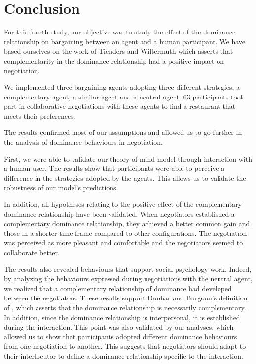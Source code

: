 \documentclass[10pt, a4paper, twocolumn]{article} %
\begin{document}
					
\section{Conclusion}

For this fourth study, our objective was to study the effect of the dominance relationship on bargaining between an agent and a human participant. We have based ourselves on the work of Tienders and Wiltermuth \cite{wiltermuth2009benefits,tiedens2003power} which asserts that complementarity in the dominance relationship had a positive impact on negotiation. 

We implemented three bargaining agents adopting three different strategies, a complementary agent, a similar agent and a neutral agent. 
63 participants took part in collaborative negotiations with these agents to find a restaurant that meets their preferences. 

The results confirmed most of our assumptions and allowed us to go further in the analysis of dominance behaviours in negotiation. 

First, we were able to validate our theory of mind model through interaction with a human user. 
The results show that participants were able to perceive a difference in the strategies adopted by the agents. This allows us to validate the robustness of our model's predictions. 

In addition, all hypotheses relating to the positive effect of the complementary dominance relationship have been validated. When negotiators established a complementary dominance relationship, they achieved a better common gain and those in a shorter time frame compared to other configurations. The negotiation was perceived as more pleasant and comfortable and the negotiators seemed to collaborate better. 

The results also revealed behaviours that support social psychology work. Indeed, by analyzing the behaviours expressed during negotiations with the neutral agent, we realized that a complementary relationship of dominance had developed between the negotiators. These results support Dunbar and Burgoon's definition of \cite{dunbar2005perceptions}, which asserts that the dominance relationship is necessarily complementary. In addition, since the dominance relationship is interpersonal, it is established during the interaction. This point was also validated by our analyses, which allowed us to show that participants adopted different dominance behaviours from one negotiation to another. This suggests that negotiators should adapt to their interlocutor to define a dominance relationship specific to the interaction. 			

\printbibliography[title={Bibliography}] %

\end{document}
